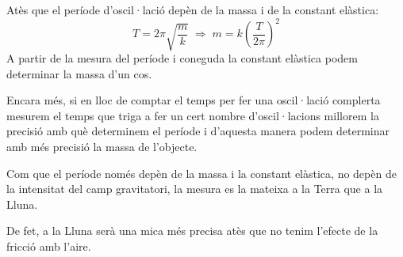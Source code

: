 \begin{solapartat}
 Atès que el període d'oscil·lació depèn de la massa i de la constant elàstica:
\[ T = 2\pi\sqrt{\frac{m}{k}} \;\Rightarrow\; m = k\left(\frac{T}{2\pi}\right)^{2} \]
A partir de la mesura del període i coneguda la constant elàstica podem determinar la massa d'un cos.

Encara més, si en lloc de comptar el temps per fer una oscil·lació complerta mesurem el temps que triga a fer un cert nombre d'oscil·lacions millorem la precisió amb què determinem el període i d'aquesta manera podem determinar amb més precisió la massa de l'objecte.

 Com que el període només depèn de la massa i la constant elàstica, no depèn de la intensitat del camp gravitatori, la mesura es la mateixa a la Terra que a la Lluna.

De fet, a la Lluna serà una mica més precisa atès que no tenim l'efecte de la fricció amb l'aire.
\end{solapartat}

